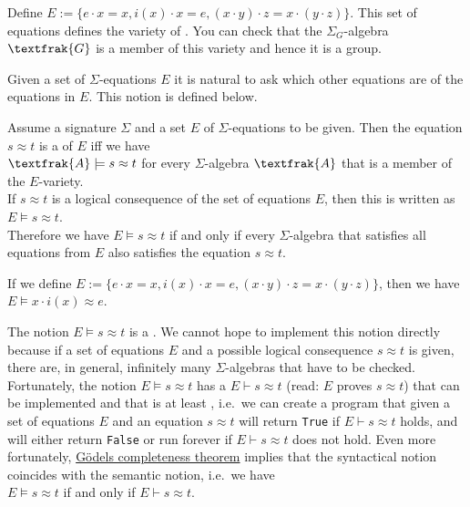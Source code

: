\example
Define $E := \bigl\{ e \cdot x = x, i(x) \cdot x = e, (x \cdot y) \cdot z = x \cdot (y \cdot z) \bigr\}$.
This set of equations defines the variety of .  You can check that the $\Sigma_G$-algebra
$\textfrak{G}$ is a member of this variety and hence it is a group.  
\eoxs

Given a set of $\Sigma$-equations $E$ it is natural to ask which other equations are  of
the equations in $E$.  This notion is defined below. 

\begin{Definition}
  Assume a signature $\Sigma$ and a set $E$ of $\Sigma$-equations to be given.
  Then the equation $s \approx t$ is a  of $E$ iff we have
  \\[0.2cm]
  \hspace*{1.3cm}
  $\textfrak{A} \models s \approx t$ \quad for every $\Sigma$-algebra $\textfrak{A}$ that is a member of the $E$-variety.
  \\[0.2cm]
  If $s \approx t$ is a logical consequence of the set of equations $E$, then this is written as
  \\[0.2cm]
  \hspace*{1.3cm}
  $E \models s \approx t$.
  \\[0.2cm]
  Therefore we have $E \models s \approx t$ if and only if every $\Sigma$-algebra that satisfies all equations
  from $E$ also satisfies the equation $s \approx t$. \eoxs
\end{Definition}

\example
If we define $E := \bigl\{ e \cdot x = x, i(x) \cdot x = e, (x \cdot y) \cdot z = x \cdot (y \cdot z) \bigr\}$,
then we have
\\[0.2cm]
\hspace*{1.3cm}
$E \models x \cdot i(x) \approx e$.  \eox

The notion $E \models s \approx t$ is a .  We cannot hope to implement this notion directly
because if a set of equations $E$ and a possible logical consequence $s \approx t$ is given, there are, in
general, infinitely many $\Sigma$-algebras that have to be checked.  Fortunately, the notion 
$E \models s \approx t$ has a  $E \vdash s \approx t$ (read: $E$ proves $s \approx t$)
that can be implemented and that is at least , i.e.~we can create a program that given 
a set of equations $E$ and an equation $s \approx t$ will return \texttt{True} if $E \vdash s \approx t$ holds, and will
either return \texttt{False} or run forever if $E \vdash s \approx t$ does not hold.  Even more fortunately,
\href{https://en.wikipedia.org/wiki/G%C3%B6del%27s_completeness_theorem}{G\"{o}dels completeness theorem} 
implies that the syntactical notion coincides with the semantic notion, i.e.~we have
\\[0.2cm]
\hspace*{1.3cm}
$E \models s \approx t$ \quad if and only if \quad $E \vdash s \approx t$.

